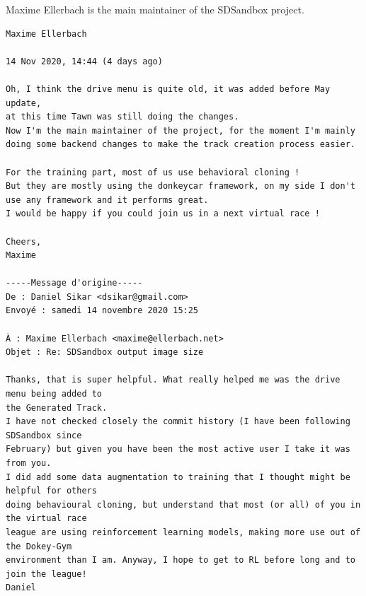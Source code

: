 Maxime Ellerbach is the main maintainer of the SDSandbox project. 

\begin{verbatim}
Maxime Ellerbach
	
14 Nov 2020, 14:44 (4 days ago)
	
Oh, I think the drive menu is quite old, it was added before May update,
at this time Tawn was still doing the changes.
Now I'm the main maintainer of the project, for the moment I'm mainly
doing some backend changes to make the track creation process easier.

For the training part, most of us use behavioral cloning !
But they are mostly using the donkeycar framework, on my side I don't
use any framework and it performs great.
I would be happy if you could join us in a next virtual race !

Cheers,
Maxime

-----Message d'origine-----
De : Daniel Sikar <dsikar@gmail.com>
Envoyé : samedi 14 novembre 2020 15:25

À : Maxime Ellerbach <maxime@ellerbach.net>
Objet : Re: SDSandbox output image size

Thanks, that is super helpful. What really helped me was the drive menu being added to
the Generated Track.
I have not checked closely the commit history (I have been following SDSandbox since
February) but given you have been the most active user I take it was from you.
I did add some data augmentation to training that I thought might be helpful for others
doing behavioural cloning, but understand that most (or all) of you in the virtual race
league are using reinforcement learning models, making more use out of the Dokey-Gym
environment than I am. Anyway, I hope to get to RL before long and to join the league!
Daniel

\end{verbatim}


